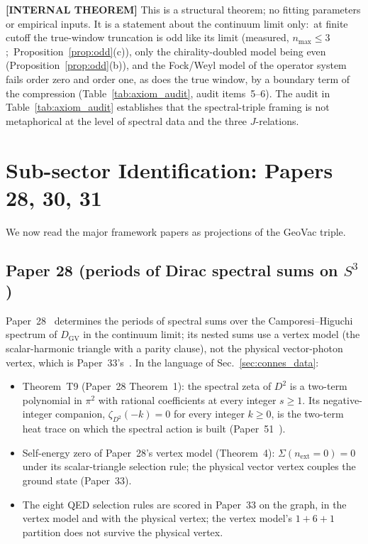 \documentclass[11pt]{article}
\begin{document}
\textbf{[INTERNAL THEOREM]} This is a structural theorem; no fitting
parameters or empirical
inputs.  It is a statement about the continuum limit only:\ at finite
cutoff the true-window truncation is odd like its limit
(measured, $n_{\max} \le 3$;\ Proposition~\ref{prop:odd}(c)), only the chirality-doubled model being
even (Proposition~\ref{prop:odd}(b)), and the
Fock/Weyl model of the operator system fails order zero and order one,
as does the true window, by a boundary term of the compression
(Table~\ref{tab:axiom_audit}, audit items~5--6).  The audit in
Table~\ref{tab:axiom_audit} establishes that the spectral-triple
framing is not metaphorical at the level of spectral data and the
three $J$-relations.

\section{Sub-sector Identification: Papers 28, 30, 31}
\label{sec:subsectors}

We now read the major framework papers as projections of the GeoVac
triple.

\subsection{Paper 28 (periods of Dirac spectral sums on $S^3$)}

Paper~28~\cite{paper28} determines the periods of spectral sums over
the Camporesi--Higuchi spectrum of $D_{\mathrm{GV}}$ in the continuum
limit; its nested sums use a vertex model (the scalar-harmonic triangle
with a parity clause), not the physical vector-photon vertex, which is
Paper~33's~\cite{paper33}.  In the language of Sec.~\ref{sec:connes_data}:
\begin{itemize}\setlength{\itemsep}{0pt}
\item Theorem~T9 (Paper~28 Theorem~1): the spectral zeta of $D^2$ is a
two-term polynomial in $\pi^2$ with rational coefficients at every
integer $s \ge 1$.  Its negative-integer companion,
$\zeta_{D^2}(-k) = 0$ for every integer $k \ge 0$, is the two-term heat
trace on which the spectral action is built (Paper~51~\cite{paper51}).
\item Self-energy zero of Paper~28's vertex model (Theorem~4):
$\Sigma(n_{\mathrm{ext}}=0) = 0$ under its scalar-triangle selection
rule; the physical vector vertex couples the ground state (Paper~33).
\item The eight QED selection rules are scored in Paper~33 on the
graph, in the vertex model and with the physical vertex; the vertex
model's $1{+}6{+}1$ partition does not survive the physical vertex.
\end{itemize}
\end{document}
